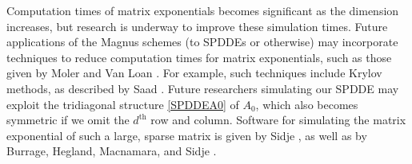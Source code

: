 \documentclass[onefignum]{siamart250211}
\begin{document}
\begin{example}
Computation times of matrix exponentials becomes significant as the dimension increases, but research is underway to improve these simulation times. Future applications of the Magnus schemes (to SPDDEs or otherwise) may incorporate techniques to reduce computation times for matrix exponentials, such as those given by Moler and Van Loan \cite{MolerVanloan1978,MolerVanLoan2003}. For example, such techniques include Krylov methods, as described by Saad \cite{Saad1992}. Future researchers simulating our SPDDE may exploit the tridiagonal structure \cref{SPDDEA0} of $A_0$, which also becomes symmetric if we omit the $d^\mathrm{th}$ row and column. Software for simulating the matrix exponential of such a large, sparse matrix is given by Sidje \cite{Sidje1998}, as well as by Burrage, Hegland, Macnamara, and Sidje \cite{Burrage2006}.




\end{example}
\end{document}
